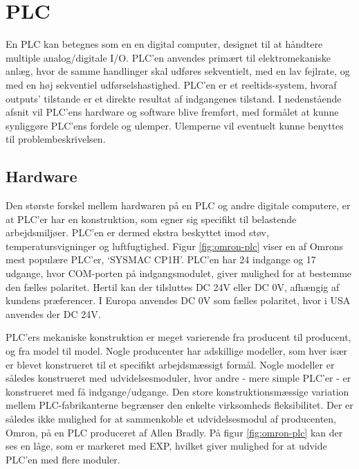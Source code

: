 \section{PLC}
En PLC kan betegnes som en en digital computer, designet til at håndtere multiple analog/digitale I/O. PLC'en anvendes primært til elektromekaniske anlæg, hvor de samme handlinger skal udføres sekventielt, med en lav fejlrate, og med en høj sekventiel udførselshastighed. PLC'en er et reeltids-system, hvoraf outputs' tilstande er et direkte resultat af indgangenes tilstand. I nedenstående afsnit vil PLC'ens hardware og software blive fremført, med formålet at kunne synliggøre PLC'ens fordele og ulemper. Ulemperne vil eventuelt kunne benyttes til problembeskrivelsen. \cite{PLC_hardware_desc} 

\subsection{Hardware}
Den største forskel mellem hardwaren på en PLC og andre digitale computere, er at PLC'er har en konstruktion, som egner sig specifikt til belastende arbejdsmiljøer. PLC'en er dermed ekstra beskyttet imod støv, temperatursvigninger og luftfugtighed. Figur \ref{fig:omron-plc} viser en af Omrons mest populære PLC'er, \enquote*{SYSMAC CP1H}. PLC'en har 24 indgange og 17 udgange, hvor COM-porten på indgangsmodulet, giver mulighed for at bestemme den fælles polaritet. Hertil kan der tilsluttes DC 24V eller DC 0V, afhængig af kundens præferencer. I Europa anvendes DC 0V som fælles polaritet, hvor i USA anvendes der DC 24V. 


\noindent PLC'ers mekaniske konstruktion er meget varierende fra producent til producent, og fra model til model. Nogle producenter har adskillige modeller, som hver især er blevet konstrueret til et specifikt arbejdsmæssigt formål. Nogle modeller er således konstrueret med udvidelsesmoduler, hvor andre - mere simple PLC'er - er konstrueret med få indgange/udgange. 
Den store konstruktionsmæssige variation mellem PLC-fabrikanterne begrænser den enkelte virksomheds fleksibilitet. Der er således ikke mulighed for at sammenkoble et udvidelsesmodul af producenten, Omron, på en PLC produceret af Allen Bradly\cite{PLC-comb}. På figur \ref{fig:omron-plc} kan der ses en låge, som er markeret med EXP, hvilket giver mulighed for at udvide PLC'en med flere moduler.

